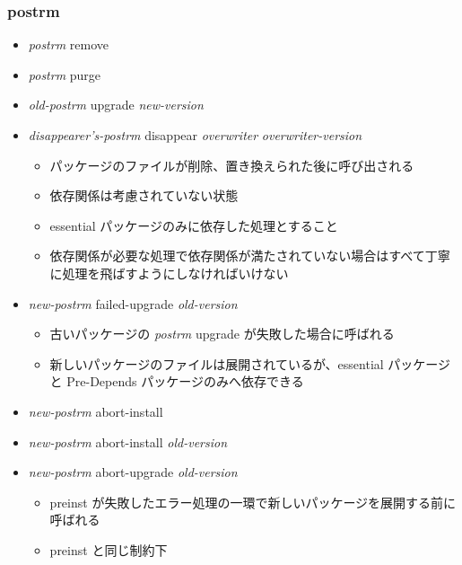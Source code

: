 \documentclass[mingoth,a4paper]{jsarticle}
\begin{document}
\subsubsection{postrm}

\begin{itemize}
\item {\it postrm} remove
\item {\it postrm} purge
\item {\it old-postrm} upgrade {\it new-version}
\item {\it disappearer's-postrm} disappear {\it overwriter} {\it overwriter-version}
  \begin{itemize}
  \item パッケージのファイルが削除、置き換えられた後に呼び出される
  \item 依存関係は考慮されていない状態
  \item essential パッケージのみに依存した処理とすること
  \item 依存関係が必要な処理で依存関係が満たされていない場合はすべて丁寧に処理を飛ばすようにしなければいけない
  \end{itemize}
\end{itemize}


\begin{itemize}
\item {\it new-postrm} failed-upgrade {\it old-version}
  \begin{itemize}
  \item 古いパッケージの {\it postrm} upgrade が失敗した場合に呼ばれる
  \item 新しいパッケージのファイルは展開されているが、essential パッケージと Pre-Depends パッケージのみへ依存できる
  \end{itemize}
\end{itemize}

\begin{itemize}
\item {\it new-postrm} abort-install
\item {\it new-postrm} abort-install {\it old-version}
\item {\it new-postrm} abort-upgrade {\it old-version}
  \begin{itemize}
  \item preinst が失敗したエラー処理の一環で新しいパッケージを展開する前に呼ばれる
  \item preinst と同じ制約下
  \end{itemize}
\end{itemize}
\end{document}
